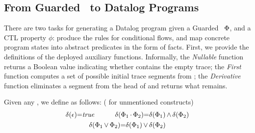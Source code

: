 \begin{comment}
At this point, we can observe that the loop terminates, as all paths in the summary are terminating. This summary is established by discovering the two-phrase linear ranking function, \ie \code{\langle \text{-}y, x \rangle}, which indicates that the loop decreases the value of \code{\text{-}y} to negative first and then decreases the value of \code{x} to negative, which leads to the exit from the loop. 
Intuitively, loops are handled by iteratively computing the guarded terminating and repetitive cases. The guards of the repetitive cases can then discover the earlier phrases' CRFs. 
\toolName next obtains a (non-)termination condition with respect to the CRFs and constructs the final loop summary with the (non-)termination condition. 

\end{comment}



\subsection{From Guarded~\code{\omegaRE} to Datalog Programs} 
\label{sec:GuardedomegaREtoDatalog}
There are two tasks for generating a Datalog program given a Guarded~\code{\omegaRE} ${\mathrm{\Phi}}$, and a CTL property $\phi$: 
produce the rules for conditional flows, and map concrete program states into abstract predicates in the form of facts. 
First, we provide the definitions of the deployed auxiliary functions. 
Informally, the \emph{Nullable} function \code{\delta(\effect)} 
returns a Boolean value indicating whether \code{\effect} 
contains the empty trace; 
the \emph{First} function  computes a set of 
possible initial trace segments from \code{\effect};
the \emph{Derivative} function  eliminates a segment  from the head of \code{\effect} and returns what remains. 


{
\begin{definition}[Nullable]\label{Nullable}
Given any \code{\effect}, we define \code{\delta(\effect)} as follows: ({ for unmentioned constructs})
{ 
\vspace{-1mm}
\begin{gather*}
\delta(\epsilon) {=}\mathit{true}
\qquad\quad 
\delta({\mathrm{\Phi}}_1 {\,\cdot\,} {\mathrm{\Phi}}_2) {=} \delta({\mathrm{\Phi}}_1) {\,\wedge\,} \delta({\mathrm{\Phi}}_2)
\\ 
\delta({\mathrm{\Phi}}_1 {\,\vee\,} {\mathrm{\Phi}}_2) {=} \delta({\mathrm{\Phi}}_1) {\,\vee\,} \delta({\mathrm{\Phi}}_2)
\\[-1.2em]
\end{gather*}}
\end{definition}}



